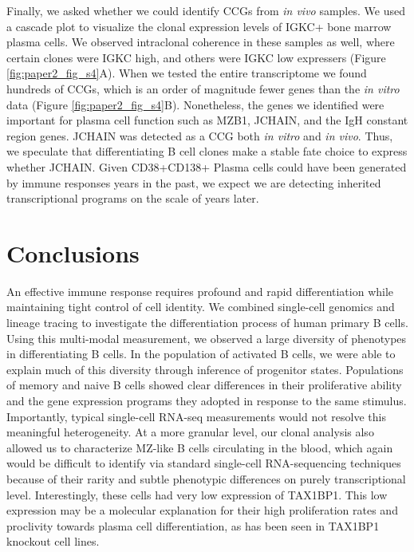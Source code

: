 Finally, we asked whether we could identify CCGs from \textit{in vivo} samples. We used a cascade plot to visualize the clonal expression levels of IGKC+ bone marrow plasma cells. We observed intraclonal coherence in these samples as well, where certain clones were IGKC high, and others were IGKC low expressers (Figure \ref{fig:paper2_fig_s4}A). When we tested the entire transcriptome we found hundreds of CCGs, which is an order of magnitude fewer genes than the \textit{in vitro} data (Figure \ref{fig:paper2_fig_s4}B). Nonetheless, the genes we identified were important for plasma cell function such as MZB1, JCHAIN, and the IgH constant region genes. JCHAIN was detected as a CCG both \textit{in vitro} and \textit{in vivo}. Thus, we speculate that differentiating B cell clones make a stable fate choice to express whether JCHAIN. Given CD38+CD138+ Plasma cells could have been generated by immune responses years in the past\cite{hammarlund_plasma_2017}, we expect we are detecting inherited transcriptional programs on the scale of years later.

\section{Conclusions}

An effective immune response requires profound and rapid differentiation while maintaining tight control of cell identity. We combined single-cell genomics and lineage tracing to investigate the differentiation process of human primary B cells. Using this multi-modal measurement, we observed a large diversity of phenotypes in differentiating B cells. In the population of activated B cells, we were able to explain much of this diversity through inference of progenitor states. Populations of memory and naive B cells showed clear differences in their proliferative ability and the gene expression programs they adopted in response to the same stimulus. Importantly, typical single-cell RNA-seq measurements would not resolve this meaningful heterogeneity. At a more granular level, our clonal analysis also allowed us to characterize MZ-like B cells circulating in the blood, which again would be difficult to identify via standard single-cell RNA-sequencing techniques because of their rarity and subtle phenotypic differences on purely transcriptional level. Interestingly, these cells had very low expression of TAX1BP1. This low expression may be a molecular explanation for their high proliferation rates and proclivity towards plasma cell differentiation, as has been seen in TAX1BP1 knockout cell lines\cite{matsushita_regulation_2016}.

